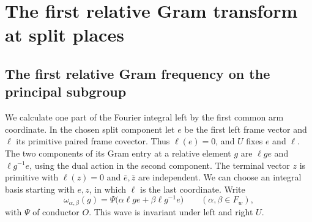 \documentclass[a4paper,11pt]{article}
\theoremstyle{definition}
\theoremstyle{remark}
\numberwithin{equation}{section}
\begin{document}
\section{The first relative Gram transform at split places}\label{nav:split-gram-transforms}

\subsection{The first relative Gram frequency on the principal subgroup}
\label{sec:firstgram890}

We calculate one part of the Fourier integral left by the first
common arm coordinate. In the chosen split component let
\(e\) be the first left frame vector and \(\ell\) its primitive
paired frame covector. Thus \(\ell(e)=0\), and \(U\) fixes \(e\)
and \(\ell\). The two components of its Gram entry at a relative
element \(g\) are \(\ell g e\) and \(\ell g^{-1}e\), using the
dual action in the second component. The terminal vector \(z\)
is primitive with \(\ell(z)=0\) and \(\bar e,\bar z\) are
independent. We can choose an integral basis starting with
\(e,z\), in which \(\ell\) is the last coordinate. Write
\[
 \omega_{\alpha,\beta}(g)=
       \Psi\big(\alpha\ell g e+\beta\ell g^{-1}e\big)
       \qquad(\alpha,\beta\in F_w),
\]
with \(\Psi\) of conductor \(O\). This wave is invariant under
left and right \(U\).
\end{document}
